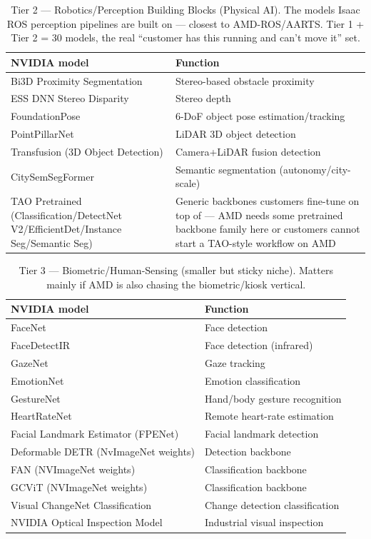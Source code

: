 \documentclass[10pt,onecolumn]{IEEEtran}
\begin{document}
\begin{table}[H]
\centering
\caption{Tier 2 --- Robotics/Perception Building Blocks (Physical AI). The models Isaac ROS perception pipelines are built on --- closest to AMD-ROS/AARTS. Tier 1 + Tier 2 = 30 models, the real ``customer has this running and can't move it'' set.}
\label{tab:a2}
\footnotesize
\begin{tabular}{@{}p{2.2in}p{4.0in}@{}}
\toprule
NVIDIA model & Function \\
\midrule
Bi3D Proximity Segmentation & Stereo-based obstacle proximity \\
ESS DNN Stereo Disparity & Stereo depth \\
FoundationPose & 6-DoF object pose estimation/tracking \\
PointPillarNet & LiDAR 3D object detection \\
Transfusion (3D Object Detection) & Camera+LiDAR fusion detection \\
CitySemSegFormer & Semantic segmentation (autonomy/city-scale) \\
TAO Pretrained (Classification/DetectNet V2/EfficientDet/Instance Seg/Semantic Seg) & Generic backbones customers fine-tune on top of --- AMD needs some pretrained backbone family here or customers cannot start a TAO-style workflow on AMD \\
\bottomrule
\end{tabular}
\end{table}

\begin{table}[H]
\centering
\caption{Tier 3 --- Biometric/Human-Sensing (smaller but sticky niche). Matters mainly if AMD is also chasing the biometric/kiosk vertical.}
\label{tab:a3}
\footnotesize
\begin{tabular}{@{}p{2.2in}p{4.0in}@{}}
\toprule
NVIDIA model & Function \\
\midrule
FaceNet & Face detection \\
FaceDetectIR & Face detection (infrared) \\
GazeNet & Gaze tracking \\
EmotionNet & Emotion classification \\
GestureNet & Hand/body gesture recognition \\
HeartRateNet & Remote heart-rate estimation \\
Facial Landmark Estimator (FPENet) & Facial landmark detection \\
Deformable DETR (NvImageNet weights) & Detection backbone \\
FAN (NVImageNet weights) & Classification backbone \\
GCViT (NVImageNet weights) & Classification backbone \\
Visual ChangeNet Classification & Change detection classification \\
NVIDIA Optical Inspection Model & Industrial visual inspection \\
\bottomrule
\end{tabular}
\end{table}
\end{document}
